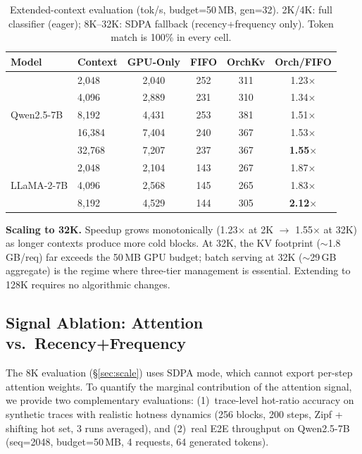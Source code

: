 \documentclass[conference]{IEEEtran}
\begin{document}
\begin{table}[t]
\centering
\caption{Extended-context evaluation (tok/s, budget=50\,MB, gen=32). 2K/4K: full classifier (eager); 8K--32K: SDPA fallback (recency+frequency only). Token match is 100\% in every cell.}
\label{tab:scale}
\footnotesize
\setlength{\tabcolsep}{4pt}
\begin{tabular}{@{}llcccc@{}}
\toprule
Model & Context & GPU-Only & FIFO & OrchKv & Orch/FIFO \\
\midrule
\multirow{5}{*}{Qwen2.5-7B}
& 2{,}048  & 2{,}040 & 252  & 311  & 1.23$\times$ \\
& 4{,}096  & 2{,}889 & 231  & 310  & 1.34$\times$ \\
& 8{,}192  & 4{,}431 & 253  & 381  & 1.51$\times$ \\
& 16{,}384 & 7{,}404 & 240  & 367  & 1.53$\times$ \\
& 32{,}768 & 7{,}207 & 237  & 367  & \textbf{1.55$\times$} \\
\midrule
\multirow{3}{*}{LLaMA-2-7B}
& 2{,}048  & 2{,}104 & 143  & 267  & 1.87$\times$ \\
& 4{,}096  & 2{,}568 & 145  & 265  & 1.83$\times$ \\
& 8{,}192  & 4{,}529 & 144  & 305  & \textbf{2.12$\times$} \\
\bottomrule
\end{tabular}
\end{table}

\textbf{Scaling to 32K.} Speedup grows monotonically (1.23$\times$ at 2K $\to$ 1.55$\times$ at 32K) as longer contexts produce more cold blocks. At 32K, the KV footprint (${\sim}$1.8\,GB/req) far exceeds the 50\,MB GPU budget; batch serving at 32K (${\sim}$29\,GB aggregate) is the regime where three-tier management is essential. Extending to 128K requires no algorithmic changes.

\subsection{Signal Ablation: Attention vs.\ Recency+Frequency}
\label{sec:signal-ablation}

The 8K evaluation (\S\ref{sec:scale}) uses SDPA mode, which cannot export per-step attention weights. To quantify the marginal contribution of the attention signal, we provide two complementary evaluations: (1)~trace-level hot-ratio accuracy on synthetic traces with realistic hotness dynamics (256 blocks, 200 steps, Zipf + shifting hot set, 3 runs averaged), and (2)~real E2E throughput on Qwen2.5-7B (seq=2048, budget=50\,MB, 4 requests, 64 generated tokens).
\end{document}
